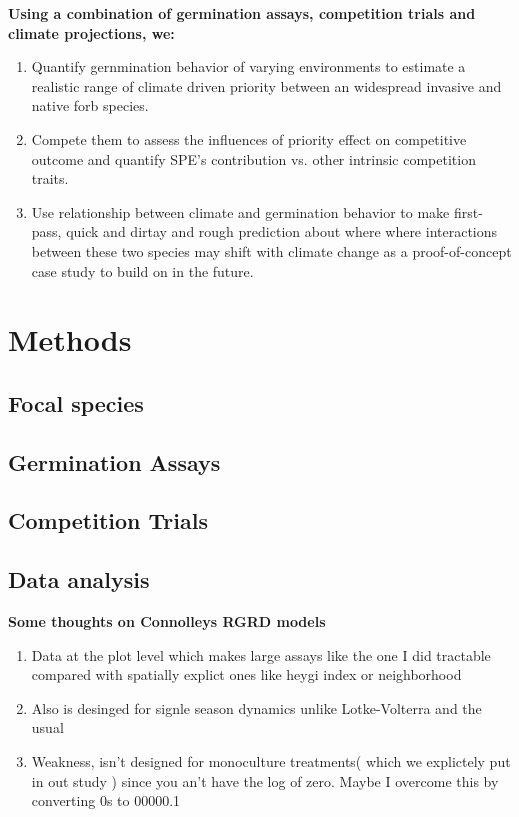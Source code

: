 \documentclass{article}\usepackage[]{graphicx}\usepackage[]{color}
\begin{document}
\textbf{Using a combination of germination assays, competition trials and climate projections, we:}
\begin{enumerate}
\item Quantify gernmination behavior of varying environments to estimate a realistic range of climate driven priority between an widespread invasive and native forb species. 
\item Compete them to assess the influences of priority effect on competitive outcome and quantify SPE's contribution vs. other intrinsic competition traits.
\item Use relationship between climate and germination behavior to make first-pass, quick and dirtay and rough prediction about where where interactions between these two species may shift with climate change as a proof-of-concept case study to build on in the future.
\end{enumerate}

\section*{Methods}
\subsection*{Focal species}
\subsection*{Germination Assays}
\subsection*{Competition Trials}
\subsection*{Data analysis}
\textbf{Some thoughts on Connolleys RGRD models}
\begin{enumerate}
\item Data at the plot level which makes large assays like the one I did tractable compared with spatially explict ones like heygi index or neighborhood
\item Also is desinged for signle season dynamics unlike Lotke-Volterra and the usual
\item Weakness, isn't designed for monoculture treatments( which we explictely put in out study ) since you an't have the log of zero. Maybe I overcome this by converting 0s to 00000.1

\end{enumerate}
\end{document}
